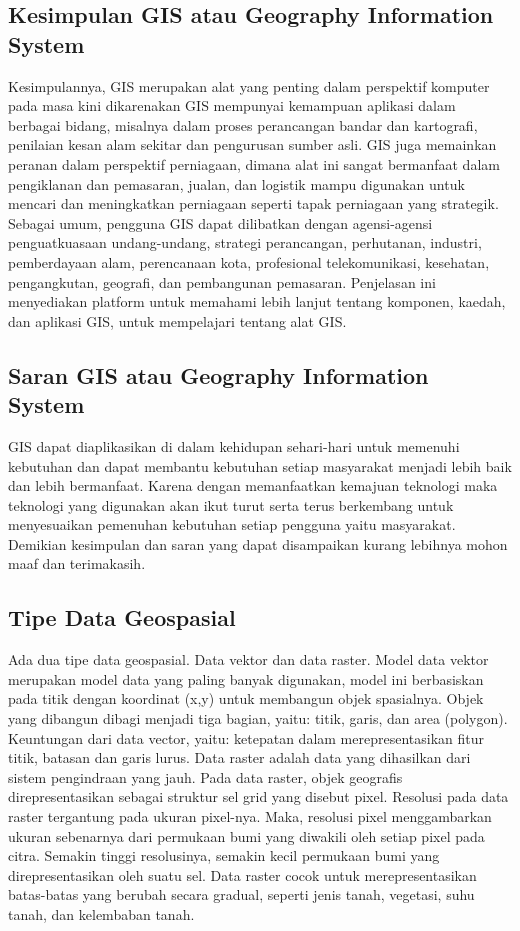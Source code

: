 \subsection{Kesimpulan GIS atau Geography Information System}
Kesimpulannya, GIS merupakan alat yang penting dalam perspektif komputer pada masa kini dikarenakan GIS
mempunyai kemampuan aplikasi dalam berbagai bidang, misalnya dalam proses perancangan bandar dan kartografi,
penilaian kesan alam sekitar dan pengurusan sumber asli. GIS juga memainkan peranan dalam perspektif perniagaan,
dimana alat ini sangat bermanfaat dalam pengiklanan dan pemasaran, jualan, dan logistik 
mampu digunakan untuk mencari dan meningkatkan perniagaan seperti tapak perniagaan yang strategik. Sebagai umum, pengguna GIS dapat dilibatkan dengan agensi-agensi penguatkuasaan undang-undang, strategi
perancangan, perhutanan, industri, pemberdayaan alam, perencanaan kota, profesional
telekomunikasi, kesehatan, pengangkutan, geografi, dan pembangunan pemasaran. 
Penjelasan ini menyediakan platform untuk memahami lebih lanjut tentang komponen, kaedah, dan aplikasi GIS, 
untuk mempelajari tentang alat GIS.
\subsection{Saran GIS atau Geography Information System}
GIS dapat diaplikasikan di dalam kehidupan sehari-hari untuk memenuhi kebutuhan dan dapat membantu kebutuhan setiap masyarakat menjadi lebih baik dan lebih bermanfaat. Karena dengan memanfaatkan kemajuan teknologi maka teknologi yang digunakan akan ikut turut serta terus berkembang untuk menyesuaikan pemenuhan kebutuhan setiap pengguna yaitu masyarakat. Demikian kesimpulan dan saran yang dapat disampaikan kurang lebihnya mohon maaf dan terimakasih.

\subsection{Tipe Data Geospasial}
Ada dua tipe data geospasial. Data vektor dan data raster. Model data vektor merupakan model data yang paling banyak digunakan, model ini berbasiskan pada titik dengan koordinat (x,y) untuk membangun objek spasialnya. Objek yang dibangun
dibagi menjadi tiga bagian, yaitu: titik, garis, dan area (polygon).
Keuntungan dari data vector, yaitu: ketepatan dalam merepresentasikan fitur titik, batasan dan
garis lurus. Data raster adalah data yang dihasilkan dari sistem pengindraan yang jauh. Pada data raster,
objek geografis direpresentasikan sebagai struktur sel grid yang disebut pixel. Resolusi pada data
raster tergantung pada ukuran pixel-nya.
Maka, resolusi pixel menggambarkan ukuran sebenarnya dari permukaan bumi yang diwakili
oleh setiap pixel pada citra. Semakin tinggi resolusinya, semakin kecil permukaan bumi yang
direpresentasikan oleh suatu sel. Data raster cocok untuk merepresentasikan batas-batas yang
berubah secara gradual, seperti jenis tanah, vegetasi, suhu tanah, dan kelembaban tanah.


